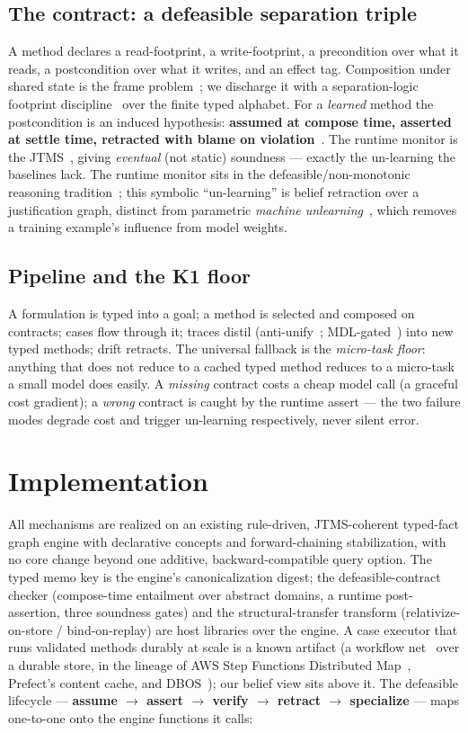 \documentclass[11pt]{article}
\newcommand{\K}{\textsf{K1}}
\begin{document}
\subsection{The contract: a defeasible separation triple}
A method declares a read-footprint, a write-footprint, a precondition over what it reads, a postcondition over what
it writes, and an effect tag. Composition under shared state is the frame problem~\cite{mccarthy1969}; we discharge
it with a separation-logic footprint discipline~\cite{ohearn2001,reynolds2002} over the finite typed alphabet. For a
\emph{learned} method the postcondition is an induced hypothesis: \textbf{assumed at compose time, asserted at
settle time, retracted with blame on violation}~\cite{findler2002,bader2018}. The runtime monitor is the
JTMS~\cite{doyle1979}, giving \emph{eventual} (not static) soundness --- exactly the un-learning the baselines lack.
The runtime monitor sits in the defeasible/non-monotonic reasoning tradition~\cite{reiter1980}; this symbolic
``un-learning'' is belief retraction over a justification graph, distinct from parametric \emph{machine
unlearning}~\cite{bourtoule2021}, which removes a training example's influence from model weights.

\subsection{Pipeline and the \K{} floor}
A formulation is typed into a goal; a method is selected and composed on contracts; cases flow through it; traces
distil (anti-unify~\cite{plotkin1970}; MDL-gated~\cite{ellis2021,bowers2023}) into new typed methods; drift
retracts. The universal fallback is the \emph{micro-task floor}: anything that does not reduce to a cached typed
method reduces to a micro-task a small model does easily. A \emph{missing} contract costs a cheap model call (a
graceful cost gradient); a \emph{wrong} contract is caught by the runtime assert --- the two failure modes degrade
cost and trigger un-learning respectively, never silent error.

\section{Implementation}
All mechanisms are realized on an existing rule-driven, JTMS-coherent typed-fact graph engine with declarative
concepts and forward-chaining stabilization, with no core change beyond one additive, backward-compatible query
option. The typed memo key is the engine's canonicalization digest; the defeasible-contract checker (compose-time
entailment over abstract domains, a runtime post-assertion, three soundness gates) and the structural-transfer
transform (relativize-on-store / bind-on-replay) are host libraries over the engine. A case executor that runs
validated methods durably at scale is a known artifact (a workflow net~\cite{vanderaalst1998} over a durable store,
in the lineage of AWS Step Functions Distributed Map~\cite{aws2022}, Prefect's content cache, and
DBOS~\cite{dbos2022}); our belief view sits above it. The defeasible lifecycle ---
\textbf{assume $\to$ assert $\to$ verify $\to$ retract $\to$ specialize} --- maps one-to-one onto the engine
functions it calls:
\end{document}
